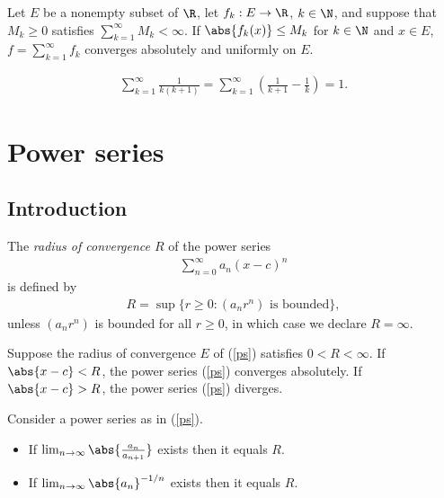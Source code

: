 \documentclass{article}
\begin{document}
\begin{theorem}
	Let $E$ be a nonempty subset of $\R$, let $f_k:E\to\R$, $k\in\N$, and suppose that $M_k\geq 0$
	satisfies $\sum_{k=1}^\infty M_k<\infty$. If $\abs{f_k(x)}\leq M_k$ for $k\in\N$ and $x\in E$,
	$f=\sum_{k=1}^\infty f_k$ converges absolutely and uniformly on $E$.
\end{theorem}

\begin{lemma*}
	\begin{align*}
		\sum_{k=1}^\infty \frac{1}{k(k+1)} = \sum_{k=1}^\infty \left(\frac{1}{k+1}-\frac{1}{k}\right)=1.
	\end{align*}	
\end{lemma*}

\section{Power series}

\subsection{Introduction}

\begin{definition}
	The \emph{radius of convergence $R$} of the power series
	\begin{align}
		\label{ps}
		\sum_{n=0}^\infty a_n(x-c)^n
	\end{align}
	is defined by
	\begin{align*}
		R = \sup\{r\geq 0:(a_nr^n) \text{ is bounded}\},
	\end{align*}
	unless $(a_nr^n)$ is bounded for all $r\geq 0$, in which case we declare $R=\infty$.
\end{definition}

\begin{theorem}[Notes 3.1]
	Suppose the radius of convergence $E$ of (\ref{ps}) satisfies $0<R<\infty$.
	If $\abs{x-c}<R$, the power series (\ref{ps}) converges absolutely. If
	$\abs{x-c}>R$, the power series (\ref{ps}) diverges.
\end{theorem}

\begin{lemma}[Example 2.2]
	Consider a power series as in (\ref{ps}).
	\begin{itemize}
		\item If $\lim_{n\to\infty}\abs{\frac{a_n}{a_{n+1}}}$ exists then it equals $R$.
		\item If $\lim_{n\to\infty}\abs{a_n}^{-1/n}$ exists then it equals $R$.
	\end{itemize}
\end{lemma}
\end{document}
